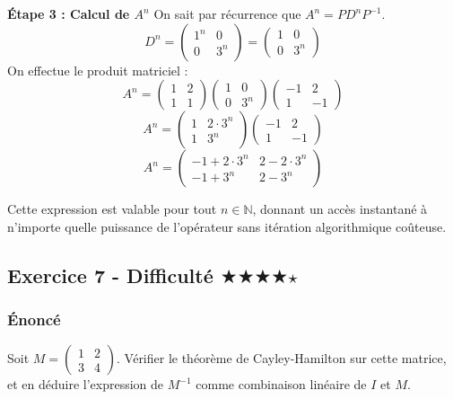 \documentclass[11pt,a4paper]{article}
\begin{document}
\textbf{Étape 3 : Calcul de $A^n$}
On sait par récurrence que $A^n = P D^n P^{-1}$.
$$D^n = \begin{pmatrix} 1^n & 0 \\ 0 & 3^n \end{pmatrix} = \begin{pmatrix} 1 & 0 \\ 0 & 3^n \end{pmatrix}$$
On effectue le produit matriciel :
$$A^n = \begin{pmatrix} 1 & 2 \\ 1 & 1 \end{pmatrix} \begin{pmatrix} 1 & 0 \\ 0 & 3^n \end{pmatrix} \begin{pmatrix} -1 & 2 \\ 1 & -1 \end{pmatrix}$$
$$A^n = \begin{pmatrix} 1 & 2 \cdot 3^n \\ 1 & 3^n \end{pmatrix} \begin{pmatrix} -1 & 2 \\ 1 & -1 \end{pmatrix}$$
$$A^n = \begin{pmatrix} -1 + 2 \cdot 3^n & 2 - 2 \cdot 3^n \\ -1 + 3^n & 2 - 3^n \end{pmatrix}$$

Cette expression est valable pour tout $n \in \mathbb{N}$, donnant un accès instantané à n'importe quelle puissance de l'opérateur sans itération algorithmique coûteuse.


\subsection*{Exercice 7 - Difficulté \quad $\bigstar$$\bigstar$$\bigstar$$\bigstar$$\star$}

\subsubsection*{Énoncé}
Soit $M = \begin{pmatrix} 1 & 2 \\ 3 & 4 \end{pmatrix}$.
Vérifier le théorème de Cayley-Hamilton sur cette matrice, et en déduire l'expression de $M^{-1}$ comme combinaison linéaire de $I$ et $M$.
\end{document}
